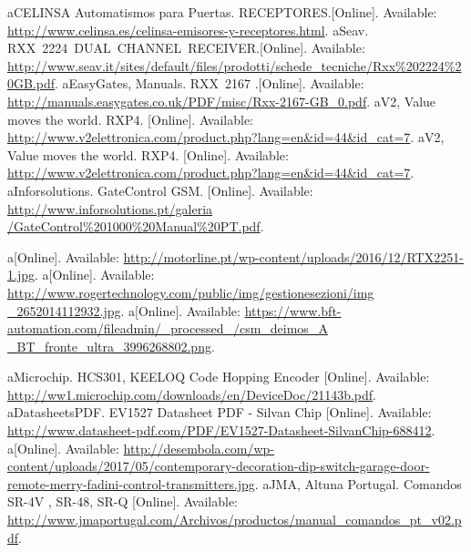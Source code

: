 \begin{thebibliography}{1}
	\bibitem aCELINSA Automatismos para Puertas. RECEPTORES.[Online]. Available: \href{http://www.celinsa.es/celinsa-emisores-y-receptores.html}{http://www.celinsa.es/celinsa-emisores-y-receptores.html}.
	\bibitem aSeav. RXX 2224 DUAL CHANNEL RECEIVER.[Online]. Available: \href{http://www.seav.it/sites/default/files/prodotti/schede_tecniche/Rxx\%202224\%20GB.pdf}{http://www.seav.it/sites/default/files/prodotti/schede\_tecniche/Rxx\%202224\%20GB.pdf}.
	\bibitem aEasyGates, Manuals. RXX 2167 .[Online]. Available: \href{http://manuals.easygates.co.uk/PDF/misc/Rxx-2167-GB_0.pdf}{http://manuals.easygates.co.uk/PDF/misc/Rxx-2167-GB\_0.pdf}.
	\bibitem aV2, Value moves the world. RXP4. [Online]. Available: \href{http://www.v2elettronica.com/product.php?lang=en\&id=44\&id_cat=7}{http://www.v2elettronica.com/product.php?lang=en\&id=44\&id\_cat=7}.
	\bibitem aV2, Value moves the world. RXP4. [Online]. Available: \href{http://www.v2elettronica.com/product.php?lang=en\&id=44\&id_cat=7}{http://www.v2elettronica.com/product.php?lang=en\&id=44\&id\_cat=7}.
	\bibitem aInforsolutions. GateControl GSM. [Online]. Available: \href{http://www.inforsolutions.pt/galeria/GateControl\%201000\%20Manual\%20PT.pdf}{http://www.inforsolutions.pt/galeria\\/GateControl\%201000\%20Manual\%20PT.pdf}.
	
	\bibitem a[Online]. Available: \href{http://motorline.pt/wp-content/uploads/2016/12/RTX2251-1.jpg}{http://motorline.pt/wp-content/uploads/2016/12/RTX2251-1.jpg}.
	\label{motorlinereceiverlink}
	\bibitem a[Online]. Available: \href{http://www.rogertechnology.com/public/img/gestionesezioni/img_2652014112932.jpg}{http://www.rogertechnology.com/public/img/gestionesezioni/img\\\_2652014112932.jpg}.
	\label{rogerreceiverlink}
	\bibitem a[Online]. Available: \href{https://www.bft-automation.com/fileadmin/_processed_/csm_deimos_A_BT_fronte_ultra_3996268802.png}{https://www.bft-automation.com/fileadmin/\_processed\_/csm\_deimos\_A\\\_BT\_fronte\_ultra\_3996268802.png}.
	\label{bftreceiverlink}
	
	\bibitem aMicrochip. HCS301, KEELOQ Code Hopping Encoder [Online]. Available: \href{http://ww1.microchip.com/downloads/en/DeviceDoc/21143b.pdf}{http://ww1.microchip.com/downloads/en/DeviceDoc/21143b.pdf}.
	\label{hcs301}
	\bibitem aDatasheetsPDF. EV1527 Datasheet PDF - Silvan Chip [Online]. Available: \href{http://www.datasheet-pdf.com/PDF/EV1527-Datasheet-SilvanChip-688412}{http://www.datasheet-pdf.com/PDF/EV1527-Datasheet-SilvanChip-688412}.
	\label{ev1527}
	\bibitem a[Online]. Available: \href{http://desembola.com/wp-content/uploads/2017/05/contemporary-decoration-dip-switch-garage-door-remote-merry-fadini-control-transmitters.jpg}{http://desembola.com/wp-content/uploads/2017/05/contemporary-decoration-dip-switch-garage-door-remote-merry-fadini-control-transmitters.jpg}.
	\label{dipremote}
	\bibitem aJMA, Altuna Portugal. Comandos SR-4V , SR-48, SR-Q [Online]. Available: \href{http://www.jmaportugal.com/Archivos/productos/manual_comandos_pt_v02.pdf}{http://www.jmaportugal.com/Archivos/productos/manual\_comandos\_pt\_v02.pdf}.
	\label{jmalink}
	

\end{thebibliography}
